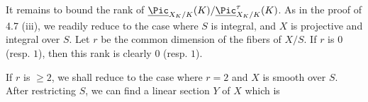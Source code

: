 It remains to bound the rank of \(\underline{\Pic}_{X_K/K}(K)/\underline{\Pic}^\tau_{X_K/K}(K)\). As in the proof of 4.7 (iii), we readily reduce to the case where \(S\) is integral, and \(X\) is projective and integral over \(S\). Let \(r\) be the common dimension of the fibers of \(X/S\). If \(r\) is \(0\) (resp. \(1\)), then this rank is clearly \(0\) (resp. \(1\)).

If \(r\) is \(\ge2\), we shall reduce to the case where \(r=2\) and \(X\) is smooth over \(S\). After restricting \(S\), we can find a linear section \(Y\) of \(X\) which is
